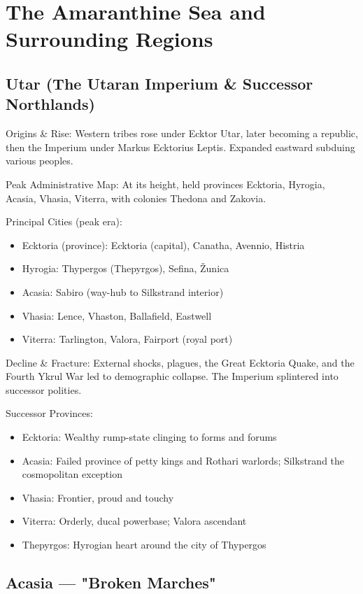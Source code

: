 \section{The Amaranthine Sea and Surrounding Regions}

\subsection{Utar (The Utaran Imperium \& Successor Northlands)}
\label{sec:utar}

Origins \& Rise: Western tribes rose under Ecktor Utar, later becoming a republic, then the Imperium under Markus Ecktorius Leptis. Expanded eastward subduing various peoples.

Peak Administrative Map: At its height, held provinces Ecktoria, Hyrogia, Acasia, Vhasia, Viterra, with colonies Thedona and Zakovia.

Principal Cities (peak era):
\begin{itemize}
    \item Ecktoria (province): Ecktoria (capital), Canatha, Avennio, Histria
    \item Hyrogia: Thypergos (Thepyrgos), Sefina, Žunica
    \item Acasia: Sabiro (way-hub to Silkstrand interior)
    \item Vhasia: Lence, Vhaston, Ballafield, Eastwell
    \item Viterra: Tarlington, Valora, Fairport (royal port)
\end{itemize}

Decline \& Fracture: External shocks, plagues, the Great Ecktoria Quake, and the Fourth Ykrul War led to demographic collapse. The Imperium splintered into successor polities.

Successor Provinces:
\begin{itemize}
    \item Ecktoria: Wealthy rump-state clinging to forms and forums
    \item Acasia: Failed province of petty kings and Rothari warlords; Silkstrand the cosmopolitan exception
    \item Vhasia: Frontier, proud and touchy
    \item Viterra: Orderly, ducal powerbase; Valora ascendant
    \item Thepyrgos: Hyrogian heart around the city of Thypergos
\end{itemize}

\subsection{Acasia — "Broken Marches"}
\label{sec:acasia}

